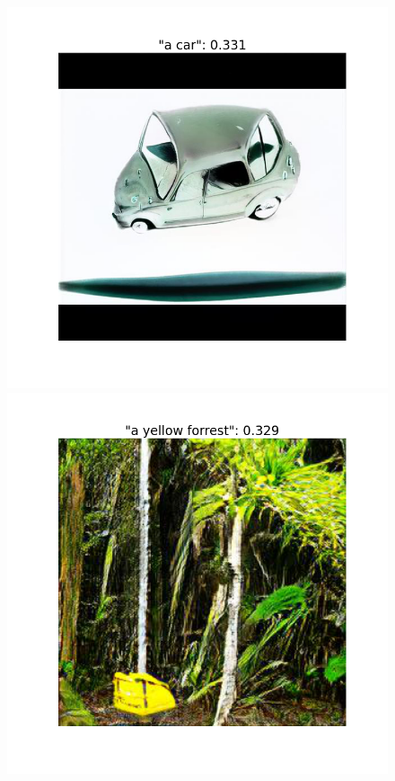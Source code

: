 \documentclass[11pt,a4paper,openany]{book}
\begin{document}
\begin{figure}[!htb]
  \includegraphics[width=\linewidth]{figs/a car_cossim.png}
\endminipage\hfill
{}
  \includegraphics[width=\linewidth]{a yellow forrest_cossim.png}

\end{figure}
\end{document}
